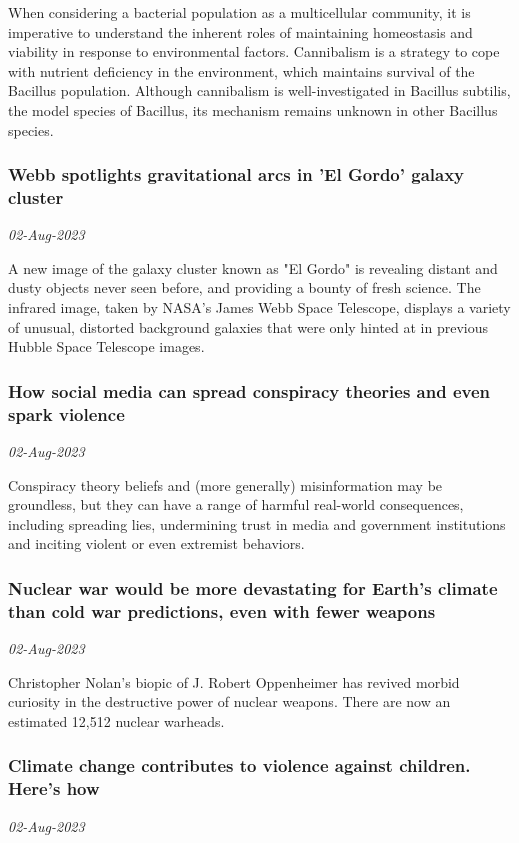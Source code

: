 When considering a bacterial population as a multicellular community, it is imperative to understand the inherent roles of maintaining homeostasis and viability in response to environmental factors. Cannibalism is a strategy to cope with nutrient deficiency in the environment, which maintains survival of the Bacillus population. Although cannibalism is well-investigated in Bacillus subtilis, the model species of Bacillus, its mechanism remains unknown in other Bacillus species.
\subsubsection{Webb spotlights gravitational arcs in 'El Gordo' galaxy cluster \href{https://phys.org/news/2023-08-webb-spotlights-gravitational-arcs-el.html}{}}
\textit{02-Aug-2023}

A new image of the galaxy cluster known as "El Gordo" is revealing distant and dusty objects never seen before, and providing a bounty of fresh science. The infrared image, taken by NASA's James Webb Space Telescope, displays a variety of unusual, distorted background galaxies that were only hinted at in previous Hubble Space Telescope images.
\subsubsection{How social media can spread conspiracy theories and even spark violence \href{https://phys.org/news/2023-08-social-media-conspiracy-theories-violence.html}{}}
\textit{02-Aug-2023}

Conspiracy theory beliefs and (more generally) misinformation may be groundless, but they can have a range of harmful real-world consequences, including spreading lies, undermining trust in media and government institutions and inciting violent or even extremist behaviors.
\subsubsection{Nuclear war would be more devastating for Earth's climate than cold war predictions, even with fewer weapons \href{https://phys.org/news/2023-08-nuclear-war-devastating-earth-climate.html}{}}
\textit{02-Aug-2023}

Christopher Nolan's biopic of J. Robert Oppenheimer has revived morbid curiosity in the destructive power of nuclear weapons. There are now an estimated 12,512 nuclear warheads.
\subsubsection{Climate change contributes to violence against children. Here's how \href{https://phys.org/news/2023-08-climate-contributes-violence-children.html}{}}
\textit{02-Aug-2023}

